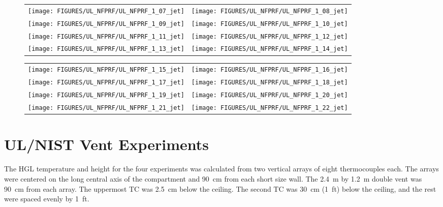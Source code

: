 \newpage

\begin{figure}[p]
\begin{tabular*}{\textwidth}{l@{\extracolsep{\fill}}r}
\texttt{[image: FIGURES/UL\_NFPRF/UL\_NFPRF\_1\_07\_jet]} &
\texttt{[image: FIGURES/UL\_NFPRF/UL\_NFPRF\_1\_08\_jet]} \\
\texttt{[image: FIGURES/UL\_NFPRF/UL\_NFPRF\_1\_09\_jet]} &
\texttt{[image: FIGURES/UL\_NFPRF/UL\_NFPRF\_1\_10\_jet]} \\
\texttt{[image: FIGURES/UL\_NFPRF/UL\_NFPRF\_1\_11\_jet]} &
\texttt{[image: FIGURES/UL\_NFPRF/UL\_NFPRF\_1\_12\_jet]} \\
\texttt{[image: FIGURES/UL\_NFPRF/UL\_NFPRF\_1\_13\_jet]} &
\texttt{[image: FIGURES/UL\_NFPRF/UL\_NFPRF\_1\_14\_jet]}
\end{tabular*}
\label{UL_NFPRF_jet_2}
\end{figure}

\begin{figure}[p]
\begin{tabular*}{\textwidth}{l@{\extracolsep{\fill}}r}
\texttt{[image: FIGURES/UL\_NFPRF/UL\_NFPRF\_1\_15\_jet]} &
\texttt{[image: FIGURES/UL\_NFPRF/UL\_NFPRF\_1\_16\_jet]} \\
\texttt{[image: FIGURES/UL\_NFPRF/UL\_NFPRF\_1\_17\_jet]} &
\texttt{[image: FIGURES/UL\_NFPRF/UL\_NFPRF\_1\_18\_jet]} \\
\texttt{[image: FIGURES/UL\_NFPRF/UL\_NFPRF\_1\_19\_jet]} &
\texttt{[image: FIGURES/UL\_NFPRF/UL\_NFPRF\_1\_20\_jet]} \\
\texttt{[image: FIGURES/UL\_NFPRF/UL\_NFPRF\_1\_21\_jet]} &
\texttt{[image: FIGURES/UL\_NFPRF/UL\_NFPRF\_1\_22\_jet]}
\end{tabular*}
\label{UL_NFPRF_jet_3}
\end{figure}

\clearpage

\section{UL/NIST Vent Experiments}

The HGL temperature and height for the four experiments was calculated from two vertical arrays of eight thermocouples each. The arrays were centered on the long central axis of the compartment and 90~cm from each short size wall. The 2.4~m by 1.2~m double vent was 90~cm from each array. The uppermost TC was 2.5~cm below the ceiling. The second TC was 30~cm (1~ft) below the ceiling, and the rest were spaced evenly by 1~ft.


